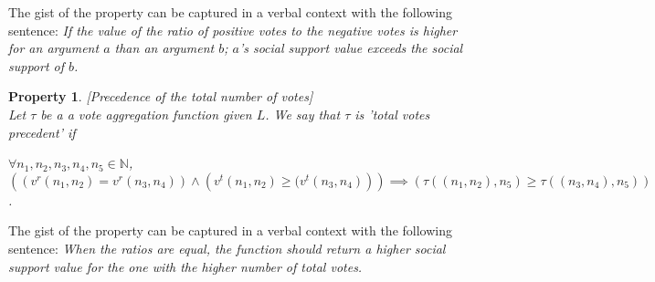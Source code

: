 \documentclass{article}
\newtheorem{property}{Property}
\newtheorem{conjecture}{Conjecture}
\newcommand{\nat}{\mathbb{N}}   %
\newcommand{\valueset}{L}
\begin{document}
The gist of the property can be captured in a verbal context with the following sentence: \emph{If the value of the ratio of positive votes to the negative votes is higher for an argument $a$ than an argument $b$; $a$'s social support value exceeds the social support of $b$.}  \\

\begin{comment}
\begin{conjecture}
Vote Aggregation function enjoys Property \ref{P2}.
\end{conjecture}

\begin{proof}  [Sketch of proof] It should suffice to show that:
\\
For two arbitrary tuples $(v^+_1, v^-_1)$ and $(v^+_2, v^-_2)$, if $\frac{v^+_1} {v^-_1} \ge \frac{v^+_2} {v^-_2}$ then $\tau(v^+_1, v^-_1, v_{max}) \ge \tau(v^+_2, v^-_2, v_{max})$. 

\end{proof}


As an example for  $(v^+_1, v^-_1) = (10,0)$ and $(v^+_2, v^-_2) = (999,1)$, $v_{max} = 1000$ and $\tau(v^+_1, v^-_1, v_{max}) = 0.9999$ and  $\tau(v^+_2, v^-_2, v_{max}) = 0.9989$.
\end{comment}


\begin{property}
\label{P3}[Precedence of the total number of votes] \\
Let $\tau$ be a a vote aggregation function given $\valueset$. We say that $\tau$ is 'total votes precedent' if
\begin{center}
 $\forall n_1, n_2, n_3, n_4, n_5 \in \nat$,  
$\left( \left(v^{r}(n_{1}, n_{2}) = v^{r}(n_{3}, n_{4}) \right) \land  \left( v^{t}(n_{1}, n_{2}) \ge ( v^{t}(n_{3}, n_{4}) \right) \right) \implies \left( \tau((n_{1}, n_{2}), n_{5}) \ge \tau((n_{3}, n_{4}), n_{5}) \right)$. 
\begin{comment}
\\
{\color{teal}
just for convenience:

 $\left( \left(v^{r}(a_{1}) = v^{r}(a_{2}) \right) \land  \left( v^{t}(a_{1}) \ge ( v^{t}(a_{2}) \right) \right) \implies \left( \tau(a_1) \ge \tau(a_2) \right)$. 
}
\end{comment}

\end{center}
\end{property}

The gist of the property can be captured in a verbal context with the following sentence: \emph{When the ratios are equal, the function should return a higher social support value for the one with the higher number of total votes.}  \\
\end{document}

